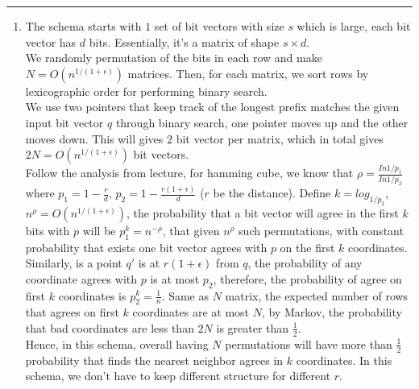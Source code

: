 \documentclass[11pt]{article}
\begin{document}




\begin{quote}

\end{quote}
\hrule


\begin{solution}
\item

\begin{enumerate}
    \item The schema starts with $1$ set of bit vectors with size $s$ which is large, each bit vector has $d$ bits. Essentially, it's a matrix of shape $s \times d$.\\
    
    We randomly permutation of the bits in each row and make $N = O(n^{1/(1+\epsilon)})$ matrices. Then, for each matrix, we sort rows by lexicographic order for performing binary search.\\
    
    We use two pointers that keep track of the longest prefix matches the given input bit vector $q$ through binary search, one pointer moves up and the other moves down. This will gives $2$ bit vector per matrix, which in total gives $2N = O(n^{1/(1+\epsilon)})$ bit vectors.\\
    
    Follow the analysis from lecture, for hamming cube, we know that $\rho = \frac{In 1/p_1}{In 1/p_2}$ where $p_1 = 1 - \frac{r}{d}$, $p_2 = 1 - \frac{r(1+\epsilon)}{d}$ ($r$ be the distance). Define $k = log_{1/p_2}$,  $n^\rho = O(n^{1/(1+\epsilon)})$, the probability that a bit vector will agree in the first $k$ bits with $p$ will be $p_1^k = n^{-\rho}$, that given $n^\rho$ such permutations, with constant probability that exists one bit vector agrees with $p$ on the first $k$ coordinates. \\
    
    Similarly, is a point $q'$ is at $r(1+\epsilon)$ from $q$, the probability of any coordinate agrees with $p$ is at most $p_2$, therefore, the probability of agree on first $k$ coordinates is $p_2^k = \frac{1}{n}$. Same as $N$ matrix, the expected number of rows that agrees on first $k$ coordinates are at most $N$, by Markov, the probability that bad coordinates are less than $2N$ is greater than $\frac{1}{2}$.\\
    
    Hence, in this schema, overall having $N$ permutations will have more than $\frac{1}{2}$ probability that finds the nearest neighbor agrees in $k$ coordinates. In this schema, we don't have to keep different structure for different $r$.
    
    
\end{enumerate}

\end{solution}
\end{document}
